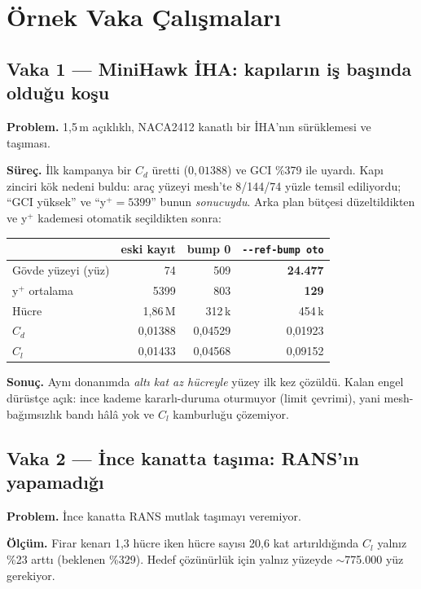 \documentclass[11pt,a4paper]{article}
\begin{document}
\section{Örnek Vaka Çalışmaları}

\subsection{Vaka 1 --- MiniHawk İHA: kapıların iş başında olduğu koşu}
\label{sub:minihawk}

\textbf{Problem.} 1{,}5\,m açıklıklı, NACA2412 kanatlı bir İHA'nın sürüklemesi
ve taşıması.

\textbf{Süreç.} İlk kampanya bir $C_d$ üretti ($0{,}01388$) ve GCI \%379 ile
uyardı. Kapı zinciri kök nedeni buldu: araç yüzeyi mesh'te 8/144/74 yüzle
temsil ediliyordu; ``GCI yüksek'' ve ``y$^+=5399$'' bunun \emph{sonucuydu}.
Arka plan bütçesi düzeltildikten ve y$^+$ kademesi otomatik seçildikten sonra:

\begin{center}\footnotesize
\begin{tabular}{@{}lrrr@{}}
\toprule
& \textbf{eski kayıt} & \textbf{bump 0} & \textbf{\texttt{-{}-ref-bump oto}} \\
\midrule
Gövde yüzeyi (yüz) & 74 & 509 & \textbf{24.477} \\
y$^+$ ortalama & 5399 & 803 & \textbf{129} \\
Hücre & 1{,}86\,M & 312\,k & 454\,k \\
$C_d$ & 0{,}01388 & 0{,}04529 & 0{,}01923 \\
$C_l$ & 0{,}01433 & 0{,}04568 & 0{,}09152 \\
\bottomrule
\end{tabular}
\end{center}

\textbf{Sonuç.} Aynı donanımda \emph{altı kat az hücreyle} yüzey ilk kez
çözüldü. Kalan engel dürüstçe açık: ince kademe kararlı-duruma oturmuyor (limit
çevrimi), yani mesh-bağımsızlık bandı hâlâ yok ve $C_l$ kamburluğu çözemiyor.

\subsection{Vaka 2 --- İnce kanatta taşıma: RANS'ın yapamadığı}
\label{sub:vaka2}

\textbf{Problem.} İnce kanatta RANS mutlak taşımayı veremiyor.

\textbf{Ölçüm.} Firar kenarı 1{,}3 hücre iken hücre sayısı 20{,}6 kat
artırıldığında $C_l$ yalnız \%23 arttı (beklenen \%329). Hedef çözünürlük için
yalnız yüzeyde $\sim$775.000 yüz gerekiyor.
\end{document}
